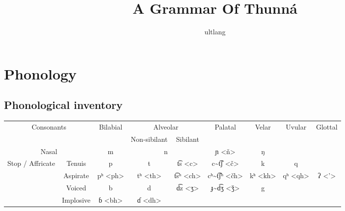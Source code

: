 \documentclass[11pt]{article} %
\title{A Grammar Of Thunná}
\author{ultlang}
\begin{document}
\maketitle

\section{Phonology}
	\subsection{Phonological inventory}
		\begin{center}
		\begin{adjustbox}{width={\textwidth},totalheight={\textheight},keepaspectratio}%
		\renewcommand{\arraystretch}{1.25}
			\begin{tabular}{|c|c||c|c|c|c|c|c|c|}
				
				\hline
				\multicolumn{2}{|c||}{\multirow{2}{*}{Consonants}} & \multirow{2}{*}{Bilabial} & \multicolumn{2}{c|}{Alveolar} & \multirow{2}{*}{Palatal}   & \multirow{2}{*}{Velar} & \multirow{2}{*}{Uvular} & \multirow{2}{*}{Glottal} \\
				\cline{4-5}
				\multicolumn{2}{|c||}{}                            &                           & Non-sibilant    & Sibilant    &                            &                        &                         &\\ \hline\hline
				 
				\multicolumn{2}{|c||}{Nasal}                       & m                         & \multicolumn{2}{c|}{n}        & ɲ <ň>                      & ŋ                      &                         &\\ \hline
				
				\multirow{4}{*}{Stop / Affricate} & Tenuis         & p                         & t               & t͡s <c>     & c\textasciitilde{}t͡ʃ <č>    &  k                   & q                       &       \\ \cline{2-9}
												  & Aspirate       & pʰ <ph>                   & tʰ <th>         & t͡sʰ <ch>   & cʰ\textasciitilde{}t͡ʃʰ <čh> & kʰ <kh>              & qʰ <qh>                 & ʔ <’> \\ \cline{2-9}
												  & Voiced         & b                         & d               & d͡z <ʒ>     & ɟ\textasciitilde{}d͡ʒ <ǯ>    &  g                   &                         &       \\ \cline{2-9}
												  & Implosive      & ɓ <bh>                    & ɗ <dh>          &             &                              &                      &                         &       \\ \hline
				

\end{tabular}
\end{adjustbox}
\end{center}
\end{document}
